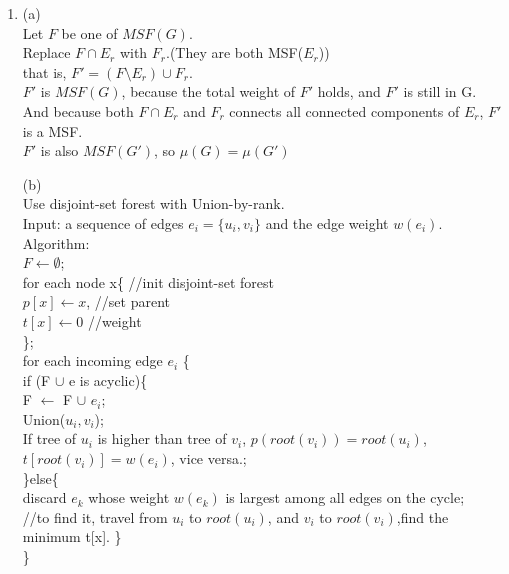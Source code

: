 \documentclass[11pt]{article}
\begin{document}
\begin{enumerate}
(b) \\
cov(X,Y)=E[XY]-E[X]E[Y]. \\
If X,Y are independent,  \\
E[X]E[Y]=$[\Sigma_i p_i X_i] [\Sigma_j p_j Y_j]$ \\
=$\Sigma_{i,j} p_i p_j X_i Y_j$ \\
=$\Sigma_{i,j} Pr[X=X_i \wedge Y=Y_j] X_i Y_j$ \\
=E[XY]. \\
So, cov(X,Y)=0. \\
If $X_1$,...,$X_n$ are pairwise independent,  \\
Var(X=$\Sigma X_i$)=$\Sigma$Var($X_i$)+$\Sigma_{i\neq j}$cov($X_i$,$X_j$) \\
=$\Sigma$Var($X_i$). \\





\item 
(a) \\
Let $F$ be one of $MSF(G)$. \\
Replace $F \cap E_r$ with $F_r$.(They are both MSF($E_r$)) \\
that is, $F'=(F\setminus E_r)\cup F_r$. \\
$F'$ is $MSF(G)$, because the total weight of $F'$ holds, and $F'$ is still in G. And because both $F \cap E_r$ and $F_r$ connects all connected components of $E_r$, $F'$ is a MSF.\\
$F'$ is also $MSF(G')$, so $\mu(G) = \mu(G')$

(b) \\
Use disjoint-set forest with Union-by-rank. \\

Input: a sequence of edges $e_i = \{u_i, v_i\}$ and the edge weight $w(e_i)$. \\ 
Algorithm: \\
$ F\leftarrow \emptyset $;  \\

for each node x\{ //init disjoint-set forest\\
$p[x]\leftarrow x$,  //set parent \\
$t[x]\leftarrow 0$   //weight\\
\}; \\
for each incoming edge $e_i$ \{  \\    
	if (F $\cup$ {e} is acyclic)\{      \\     
		F $\leftarrow$ F $\cup$ {$e_i$};      \\
		Union($u_i, v_i$); \\
		If tree of $u_i$ is higher than tree of $v_i$, $ p(root(v_i))=root(u_i)$, $t[root(v_i)]=w(e_i)$, vice versa.; \\
	\}else\{           \\
		discard $e_k$ whose weight $w(e_k)$ is largest among all edges on the cycle;         \\
		//to find it, travel from $u_i$ to $root(u_i)$, and $v_i$ to $root(v_i)$,find the minimum t[x].
	\} \\
\}


\end{enumerate}
\end{document}
